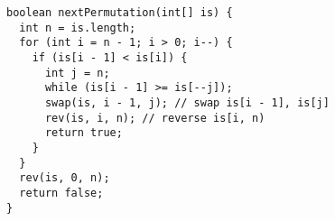 \begin{lstlisting}
boolean nextPermutation(int[] is) {
  int n = is.length;
  for (int i = n - 1; i > 0; i--) {
    if (is[i - 1] < is[i]) {
      int j = n;
      while (is[i - 1] >= is[--j]);
      swap(is, i - 1, j); // swap is[i - 1], is[j]
      rev(is, i, n); // reverse is[i, n)
      return true;
    }
  }
  rev(is, 0, n);
  return false;
}

\end{lstlisting}
